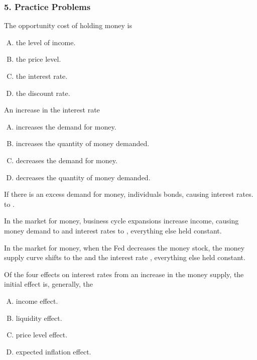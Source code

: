 \documentclass{beamer}
\begin{document}
\begin{practiceframe}[allowframebreaks]
    \frametitle{5. Practice Problems}
The opportunity cost of holding money is
\begin{enumerate}[A. ]
    \item the level of income.
    \item the price level.
    \item the interest rate.
    \item the discount rate.
\end{enumerate}
\vspace{1em}

An increase in the interest rate
\begin{enumerate}[A. ]
    \item increases the demand for money.
    \item increases the quantity of money demanded.
    \item decreases the demand for money.
    \item decreases the quantity of money demanded.
\end{enumerate}

\vspace{1em}
If there is an excess demand for money, individuals \underline{\hspace{2cm}} bonds, causing interest rates. to \underline{\hspace{2cm}}.
\vspace{1em}

\framebreak

In the market for money, business cycle expansions increase income, causing money demand to \underline{\hspace{2cm}} and interest rates to \underline{\hspace{2cm}}, everything else held constant.
\vspace{1em}

In the market for money, when the Fed decreases the money stock, the money supply curve shifts to the \underline{\hspace{2cm}} and the interest rate \underline{\hspace{2cm}}, everything else held constant.

\vspace{1em}
Of the four effects on interest rates from an increase in the money supply, the initial effect is, generally, the
\begin{enumerate}[A. ]
    \item income effect.
    \item liquidity effect.
    \item price level effect.
    \item expected inflation effect.
\end{enumerate}
\framebreak


\end{practiceframe}
\end{document}
